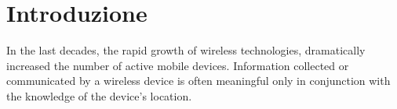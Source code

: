 \chapter{Introduzione}
\label{chap:Introduction}
In the last decades, the rapid growth of wireless technologies, dramatically increased the number of 
active mobile devices. Information collected or communicated by a wireless device is often meaningful 
only in conjunction with the knowledge of the device's location.



%
%


